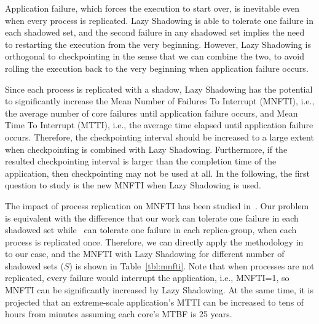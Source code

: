 Application failure, which forces the execution to start over, is inevitable even when every process is replicated. Lazy Shadowing is able to 
tolerate one failure in each shadowed set, and the second failure in any shadowed set implies the need to restarting the execution from the very beginning. However, Lazy Shadowing is orthogonal to checkpointing in 
the sense that we can combine the two, to avoid rolling the execution back to the very beginning when application failure occurs.

Since each process is replicated with a shadow, Lazy Shadowing has the potential to significantly 
increase the Mean Number of Failures To Interrupt (MNFTI), i.e., the average number of core failures until application failure occurs, and Mean Time To Interrupt (MTTI), i.e., the average time elapsed until application failure occurs. 
Therefore, the checkpointing interval should be increased to a large extent when checkpointing is combined with Lazy Shadowing. Furthermore, if the resulted checkpointing interval is 
larger than the completion time of the application, then checkpointing may not be used at
all. 
In the following, the first question to study is the new MNFTI when Lazy Shadowing is used. 


The impact of process replication on MNFTI has been studied in~\cite{casanova_inria_2012}. Our problem
is equivalent with the difference that our work can tolerate one failure in each shadowed 
set while~\cite{casanova_inria_2012} can tolerate one failure in each replica-group, when each process
is replicated once. 
Therefore, we can directly apply the methodology in~\cite{casanova_inria_2012} to our case, and the MNFTI
with Lazy Shadowing for different number of shadowed sets ($S$) is shown in Table~\ref{tbl:mnfti}. 
Note that when processes are not replicated, every failure would interrupt the application, i.e., MNFTI=1, so MNFTI can be significantly increased by Lazy Shadowing. 
At the same time, it is projected that an extreme-scale application's MTTI can be increased to tens of hours from minutes assuming each core's MTBF is 25 years.

